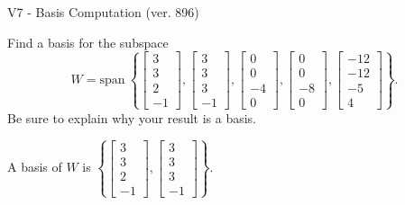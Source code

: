 \begin{exercise}
  \begin{exerciseTitle}V7 - Basis Computation (ver. 896)\end{exerciseTitle}
  \begin{exerciseStatement}
    Find a basis for the subspace 
\[W=\mathrm{span}\ \left\{\left[\begin{array}{r}
3 \\
3 \\
2 \\
-1
\end{array}\right] , \left[\begin{array}{r}
3 \\
3 \\
3 \\
-1
\end{array}\right] , \left[\begin{array}{r}
0 \\
0 \\
-4 \\
0
\end{array}\right] , \left[\begin{array}{r}
0 \\
0 \\
-8 \\
0
\end{array}\right] , \left[\begin{array}{r}
-12 \\
-12 \\
-5 \\
4
\end{array}\right]\right\}.\]
 Be sure to explain why your result is a basis.


  \end{exerciseStatement}
  \begin{exerciseAnswer}
   A basis of \(W\) is  \(\left\{\left[\begin{array}{r}
3 \\
3 \\
2 \\
-1
\end{array}\right] , \left[\begin{array}{r}
3 \\
3 \\
3 \\
-1
\end{array}\right]\right\}\).
  


  \end{exerciseAnswer}
\end{exercise}